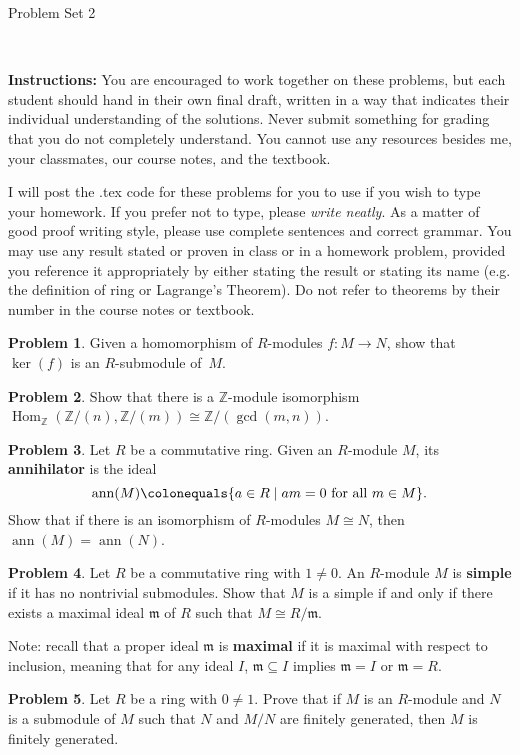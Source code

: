 \documentclass[11pt]{article}
\title{}
\date{\vspace{-0.5in}}
\newcommand{\Z}{\mathbb{Z}}
\DeclareMathOperator{\Hom}{Hom}
\DeclareMathOperator{\ann}{ann}
\newcommand{\m}{\mathfrak{m}}
\theoremstyle{definition}
\newtheorem{problem}{Problem}
\begin{document}
\thispagestyle{fancy}
\pagestyle{fancy}

\vspace{3em}

\begin{center}
	{\LARGE Problem Set 2}
\end{center}

\

\noindent
{\bf Instructions:}
You are encouraged to work together on these problems, but each student should hand in their own final draft, written in a way that indicates their individual understanding of the solutions. Never submit something for grading that you do not completely understand. You cannot use any resources besides me, your classmates, our course notes, and the textbook.


I will post the .tex code for these problems for you to use if you wish to type your homework. If you prefer not to type, please  {\em write neatly}. As a matter of good proof writing style, please use complete sentences and correct grammar. You may use any result  stated or proven in class or in a homework problem, provided you reference it appropriately by either stating the result or stating its name (e.g. the definition of ring or Lagrange's Theorem). Do not refer to theorems by their number in the course notes or textbook.


\vspace{2em}





\begin{problem}
	Given a homomorphism of $R$-modules $f\!: M \to N$, show that $\ker(f)$ is an $R$-submodule of~$M$.
\end{problem}


\begin{problem}
	Show that there is a $\Z$-module isomorphism $\Hom_\Z(\Z/(n),\Z/(m)) \cong \Z / (\gcd(m,n))$.
\end{problem}


\begin{problem}
Let $R$ be a commutative ring. Given an $R$-module $M$, its {\bf annihilator} is the ideal 
$$\ann(M) \colonequals \{ a \in R \mid am = 0 \textrm{ for all } m \in M \}.$$
Show that if there is an isomorphism of $R$-modules $M \cong N$, then $\ann(M) = \ann(N)$.
\end{problem}



\begin{problem}
Let $R$ be a commutative ring with $1 \neq 0$. An $R$-module $M$ is {\bf simple} if it has no nontrivial submodules.
Show that $M$ is a simple if and only if there exists a maximal ideal $\m$ of $R$ such that $M \cong R/\m$.

\noindent
Note: recall that a proper ideal $\m$ is {\bf maximal} if it is maximal with respect to inclusion, meaning that for any ideal $I$, $\m \subseteq I$ implies $\m = I$ or $\m = R$.
\end{problem}


\begin{problem}
	Let $R$ be a ring with $0\neq 1$. Prove that if $M$ is an $R$-module and $N$ is a submodule of $M$ such that $N$ and $M/N$ are finitely generated, then $M$ is finitely generated.
\end{problem}
\end{document}
